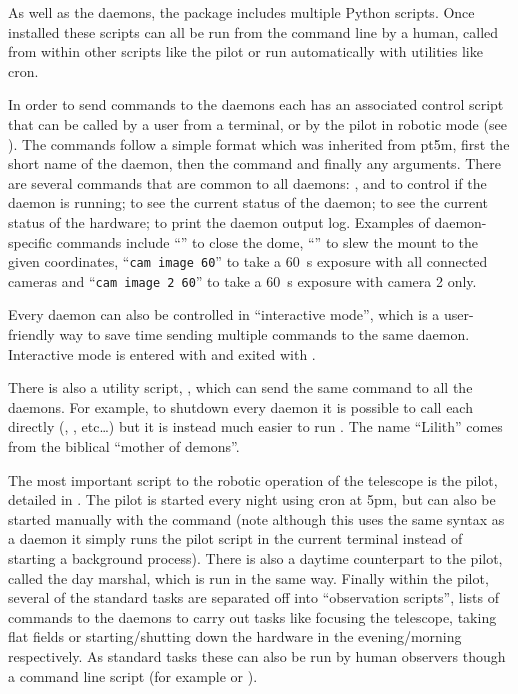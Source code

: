 \begin{colsection}
\begin{colsection}
As well as the daemons, the  package includes multiple Python scripts. Once installed these scripts can all be run from the command line by a human, called from within other scripts like the pilot or run automatically with utilities like cron.

In order to send commands to the daemons each has an associated control script that can be called by a user from a terminal, or by the pilot in robotic mode (see ). The commands follow a simple format which was inherited from \gls{pt5m}, first the short name of the daemon, then the command and finally any arguments. There are several commands that are common to all daemons: ,  and  to control if the daemon is running;  to see the current status of the daemon;  to see the current status of the hardware;  to print the daemon output log. Examples of daemon-specific commands include ``'' to close the dome, ``'' to slew the mount to the given coordinates, ``\texttt{cam~image~60}'' to take a \SI{60}{\second} exposure with all connected cameras and ``\texttt{cam~image~2~60}'' to take a \SI{60}{\second} exposure with camera 2 only.

Every daemon can also be controlled in ``interactive mode'', which is a user-friendly way to save time sending multiple commands to the same daemon. Interactive mode is entered with  and exited with .

There is also a utility script, , which can send the same command to all the daemons. For example, to shutdown every daemon it is possible to call each directly (, ,  etc\ldots) but it is instead much easier to run . The name ``Lilith'' comes from the biblical ``mother of demons''.

The most important script to the robotic operation of the telescope is the pilot, detailed in . The pilot is started every night using cron at 5pm, but can also be started manually with the command  (note although this uses the same syntax as a daemon it simply runs the pilot script in the current terminal instead of starting a background process). There is also a daytime counterpart to the pilot, called the day marshal, which is run in the same way. Finally within the pilot, several of the standard tasks are separated off into ``observation scripts'', lists of commands to the daemons to carry out tasks like focusing the telescope, taking flat fields or starting/shutting down the hardware in the evening/morning respectively. As standard tasks these can also be run by human observers though a command line script  (for example  or ).


\end{colsection}
\end{colsection}
